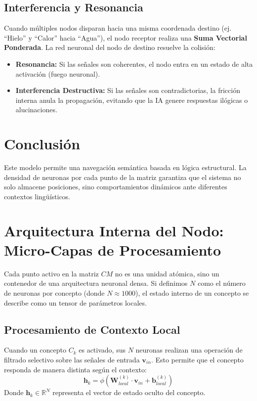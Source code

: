 \documentclass[12pt]{article}
\begin{document}
\subsection{Interferencia y Resonancia}
Cuando múltiples nodos disparan hacia una misma coordenada destino (ej. ``Hielo'' y ``Calor'' hacia ``Agua''), el nodo receptor realiza una \textbf{Suma Vectorial Ponderada}. La red neuronal del nodo de destino resuelve la colisión:
\begin{itemize}
    \item \textbf{Resonancia:} Si las señales son coherentes, el nodo entra en un estado de alta activación (fuego neuronal).
    \item \textbf{Interferencia Destructiva:} Si las señales son contradictorias, la fricción interna anula la propagación, evitando que la IA genere respuestas ilógicas o alucinaciones.
\end{itemize}

\section{Conclusión}
Este modelo permite una navegación semántica basada en lógica estructural. La densidad de neuronas por cada punto de la matriz garantiza que el sistema no solo almacene posiciones, sino comportamientos dinámicos ante diferentes contextos lingüísticos.

\section{Arquitectura Interna del Nodo: Micro-Capas de Procesamiento}
Cada punto activo en la matriz $CM$ no es una unidad atómica, sino un contenedor de una arquitectura neuronal densa. Si definimos $N$ como el número de neuronas por concepto (donde $N \approx 1000$), el estado interno de un concepto se describe como un tensor de parámetros locales.

\subsection{Procesamiento de Contexto Local}
Cuando un concepto $C_k$ es activado, sus $N$ neuronas realizan una operación de filtrado selectivo sobre las señales de entrada $\mathbf{v}_{in}$. Esto permite que el concepto responda de manera distinta según el contexto:
$$ \mathbf{h}_k = \phi( \mathbf{W}_{local}^{(k)} \cdot \mathbf{v}_{in} + \mathbf{b}_{local}^{(k)} ) $$
Donde $\mathbf{h}_k \in \mathbb{R}^N$ representa el vector de estado oculto del concepto.
\end{document}
